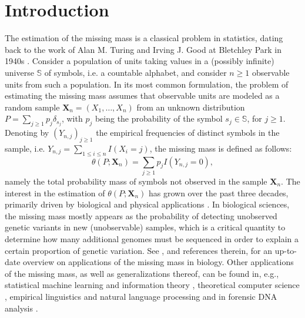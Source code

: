 \documentclass{article}
\newcommand{\1}{\boldsymbol{1}}
\theoremstyle{plain}
\begin{document}

\section{Introduction}

The estimation of the missing mass is a classical problem in statistics, dating back to the work of Alan M. Turing and Irving J. Good at Bletchley Park in 1940s \cite{Goo(53)}. Consider a population of units taking values in a (possibly infinite) universe $\mathbb{S}$ of symbols, i.e. a countable alphabet, and consider $n\geq1$ observable units from such a population. In its most common formulation, the problem of estimating the missing mass assumes that observable units are modeled as a random sample $\mathbf{X}_{n}=(X_{1},\ldots,X_{n})$ from an unknown distribution $P=\sum_{j\geq1}p_{j}\delta_{s_{j}}$, with $p_{j}$ being the probability of the symbol $s_{j}\in\mathbb{S}$, for $j\geq1$. Denoting by $(Y_{n,j})_{j\geq1}$ the empirical frequencies of distinct symbols in the sample, i.e. $Y_{n,j}=\sum_{1\leq i\leq n}I(X_{i}=j)$, the missing mass is defined as follows:
\begin{equation}\label{eq:missing}
\theta(P;\mathbf{X}_{n})=\sum_{j\geq1}p_{j}I(Y_{n,j}=0),
\end{equation}
namely the total probability mass of symbols not observed in the sample $\mathbf{X}_{n}$. The interest in the estimation of $\theta(P;\mathbf{X}_{n})$ has grown over the past three decades, primarily driven by biological and physical applications \cite{Mao(02),Gao(07),Ion(09),Dal(13),Dal(14)}. In biological sciences, the missing mass mostly appears as the probability of detecting unobserved genetic variants in new (unobservable) samples, which is a critical quantity to determine how many additional genomes must be sequenced in order to explain a certain proportion of genetic variation. See \cite{Den(19)}, and references therein, for an up-to-date overview on applications of the missing mass in biology. Other applications of the missing mass, as well as generalizations thereof, can be found in, e.g., statistical machine learning and information theory \cite{Bub(13),Orl(04),Ben(18)}, theoretical computer science \cite{Mot(06),Cai(18)}, empirical linguistics and natural language processing \cite{Gal(95)} and in forensic DNA analysis \cite{Cer(17)}.
\end{document}
